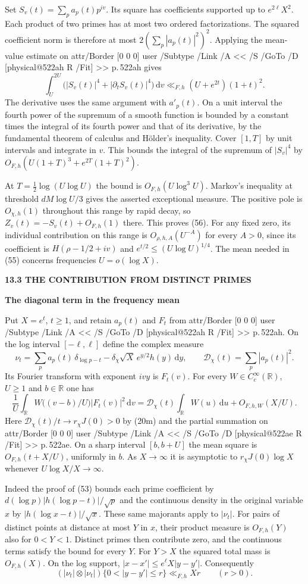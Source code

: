 \documentclass[11pt,letterpaper]{article}
\makeatletter
\newcommand{\rightmarktext}{}
\newcommand{\printfolio}{}
\newcommand{\leaf}[4]{\clearpage\gdef\printfolio{#1}\gdef\rightmarktext{#2}%
  {\small\sffamily\bfseries\color{ink}#3\par}\vspace{3pt}%
  {\LARGE\bfseries #4\par}\vspace{5pt}}
\newcommand{\R}{\mathbb R}
\newcommand{\dd}{\,\mathrm d}
\newcommand{\MusicPDFPageRef}[1]{\pdfpageref\csname physical@#1\endcsname\space\space 0 R}
\newcommand{\pagelink}[2]{\leavevmode\pdfstartlink attr{/Border [0 0 0]} user{%
  /Subtype /Link /A << /S /GoTo /D [\MusicPDFPageRef{#1} /Fit] >>}%
  {\color{ink}#2}\pdfendlink}
\newcommand{\pg}[1]{\pagelink{#1}{p.\,#1}}
\makeatother
\begin{document}
Set $S_v(t)=\sum_p a_p(t)p^{iv}$. Its square has coefficients
supported up to $e^{2\ell}X^2$. Each product of two primes has at
most two ordered factorizations. The squared coefficient norm is
therefore at most $2(\sum_p|a_p(t)|^2)^2$. Applying the mean-value
estimate on \pg{522ah} gives
\[
 \int_U^{2U}\big(|S_v(t)|^4+|\partial_t S_v(t)|^4\big)\dd v
                   \ll_{F,h}(U+e^{2t})(1+t)^2 .
\]
The derivative uses the same argument with $a'_p(t)$.
On a unit interval the fourth power of the supremum of a smooth
function is bounded by a constant times the integral of its fourth
power and that of its derivative, by the fundamental theorem of
calculus and H\"older's inequality. Cover $[1,T]$ by unit intervals
and integrate in $v$. This bounds the integral of the supremum
of $|S_v|^4$ by $O_{F,h}(U(1+T)^3+e^{2T}(1+T)^2)$.

At $T=\tfrac12\log(U\log U)$ the bound is $O_{F,h}(U\log^3 U)$.
Markov's inequality at threshold $dM\log U/3$ gives the asserted
exceptional measure. The positive pole is $O_{\chi,h}(1)$ throughout
this range by rapid decay, so $Z_v(t)=-S_v(t)+O_{F,h}(1)$ there.
This proves (56). For any fixed zero, its individual contribution
on this range is $O_{\rho,h,A}(U^{-A})$ for every $A>0$, since its
coefficient is $H(\rho-1/2+iv)$ and $e^{t/2}\le(U\log U)^{1/4}$.
The mean needed in (55) concerns frequencies $U=o(\log X)$.

\leaf{522ak}{The mean over a frequency interval}{13.3 \quad THE CONTRIBUTION FROM DISTINCT PRIMES}{The diagonal term in the frequency mean}
Put $X=e^t$, $t\ge1$, and retain $a_p(t)$ and $F_t$ from \pg{522ah}.
On the log interval $[-\ell,\ell]$ define the complex measure
\[
 \nu_t=\sum_p a_p(t)\,\delta_{\log p-t}
       -\delta_\chi\sqrt X\,e^{y/2}h(y)\dd y,\qquad
 \mathcal D_\chi(t)=\sum_p|a_p(t)|^2 .
\]
Its Fourier transform with exponent $ivy$ is $F_t(v)$. For every
$W\in C_c^\infty(\R)$, $U\ge1$ and $b\in\R$ one has
\[
 \frac1U\int_\R W\big((v-b)/U\big)|F_t(v)|^2\dd v
 =\mathcal D_\chi(t)\int_\R W(u)\dd u+O_{F,h,W}(X/U).
 \tag{57}
\]
Here $\mathcal D_\chi(t)/t\to r_\chi J(0)>0$ by (20m) and the
partial summation on \pg{522ae}. On a sharp interval $[b,b+U]$ the
mean square is $O_{F,h}(t+X/U)$, uniformly in $b$. As $X\to\infty$
it is asymptotic to $r_\chi J(0)\log X$ whenever $U\log X/X\to\infty$.

Indeed the proof of (53) bounds each prime coefficient by
$d(\log p)|h(\log p-t)|/\sqrt p$ and the continuous density in the
original variable $x$ by $|h(\log x-t)|/\sqrt x$. These same majorants
apply to $|\nu_t|$. For pairs of distinct points at distance at most
$Y$ in $x$, their product measure is $O_{F,h}(Y)$ also for $0<Y<1$.
Distinct primes then contribute zero, and the continuous terms satisfy
the bound for every $Y$. For $Y>X$ the squared total mass is $O_{F,h}(X)$.
On the log support, $|x-x'|\le e^\ell X|y-y'|$. Consequently
\[
 (|\nu_t|\otimes|\nu_t|)\{0<|y-y'|\le r\}\ll_{F,h} Xr\qquad(r>0).
\]
\end{document}
